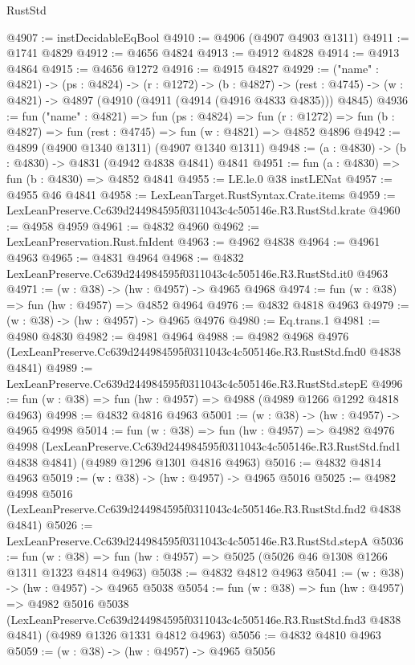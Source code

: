 \begin{lexlean}{RustStd}
\begin{coremodule}
@4907 := instDecidableEqBool
@4910 := @4906 (@4907 @4903 @1311)
@4911 := @1741 @4829
@4912 := @4656 @4824
@4913 := @4912 @4828
@4914 := @4913 @4864
@4915 := @4656 @1272
@4916 := @4915 @4827
@4929 := ("name" : @4821) ->
  (ps : @4824) ->
  (r : @1272) ->
  (b : @4827) ->
  (rest : @4745) -> (w : @4821) -> @4897 (@4910 (@4911 (@4914 (@4916 @4833 @4835))) @4845)
@4936 := fun ("name" : @4821) =>
  fun (ps : @4824) =>
  fun (r : @1272) => fun (b : @4827) => fun (rest : @4745) => fun (w : @4821) => @4852 @4896
@4942 := @4899 (@4900 @1340 @1311) (@4907 @1340 @1311)
@4948 := (a : @4830) -> (b : @4830) -> @4831 (@4942 @4838 @4841) @4841
@4951 := fun (a : @4830) => fun (b : @4830) => @4852 @4841
@4955 := LE.le.{0} @38 instLENat
@4957 := @4955 @46 @4841
@4958 := LexLeanTarget.RustSyntax.Crate.items
@4959 := LexLeanPreserve.Cc639d244984595f0311043c4c505146e.R3.RustStd.krate
@4960 := @4958 @4959
@4961 := @4832 @4960
@4962 := LexLeanPreservation.Rust.fnIdent
@4963 := @4962 @4838
@4964 := @4961 @4963
@4965 := @4831 @4964
@4968 := @4832 LexLeanPreserve.Cc639d244984595f0311043c4c505146e.R3.RustStd.it0 @4963
@4971 := (w : @38) -> (hw : @4957) -> @4965 @4968
@4974 := fun (w : @38) => fun (hw : @4957) => @4852 @4964
@4976 := @4832 @4818 @4963
@4979 := (w : @38) -> (hw : @4957) -> @4965 @4976
@4980 := Eq.trans.{1}
@4981 := @4980 @4830
@4982 := @4981 @4964
@4988 := @4982
    @4968
    @4976
    (LexLeanPreserve.Cc639d244984595f0311043c4c505146e.R3.RustStd.fnd0 @4838 @4841)
@4989 := LexLeanPreserve.Cc639d244984595f0311043c4c505146e.R3.RustStd.stepE
@4996 := fun (w : @38) => fun (hw : @4957) => @4988 (@4989 @1266 @1292 @4818 @4963)
@4998 := @4832 @4816 @4963
@5001 := (w : @38) -> (hw : @4957) -> @4965 @4998
@5014 := fun (w : @38) =>
  fun (hw : @4957) =>
  @4982
    @4976
    @4998
    (LexLeanPreserve.Cc639d244984595f0311043c4c505146e.R3.RustStd.fnd1 @4838 @4841)
    (@4989 @1296 @1301 @4816 @4963)
@5016 := @4832 @4814 @4963
@5019 := (w : @38) -> (hw : @4957) -> @4965 @5016
@5025 := @4982
    @4998
    @5016
    (LexLeanPreserve.Cc639d244984595f0311043c4c505146e.R3.RustStd.fnd2 @4838 @4841)
@5026 := LexLeanPreserve.Cc639d244984595f0311043c4c505146e.R3.RustStd.stepA
@5036 := fun (w : @38) => fun (hw : @4957) => @5025 (@5026 @46 @1308 @1266 @1311 @1323 @4814 @4963)
@5038 := @4832 @4812 @4963
@5041 := (w : @38) -> (hw : @4957) -> @4965 @5038
@5054 := fun (w : @38) =>
  fun (hw : @4957) =>
  @4982
    @5016
    @5038
    (LexLeanPreserve.Cc639d244984595f0311043c4c505146e.R3.RustStd.fnd3 @4838 @4841)
    (@4989 @1326 @1331 @4812 @4963)
@5056 := @4832 @4810 @4963
@5059 := (w : @38) -> (hw : @4957) -> @4965 @5056

\end{coremodule}
\end{lexlean}

